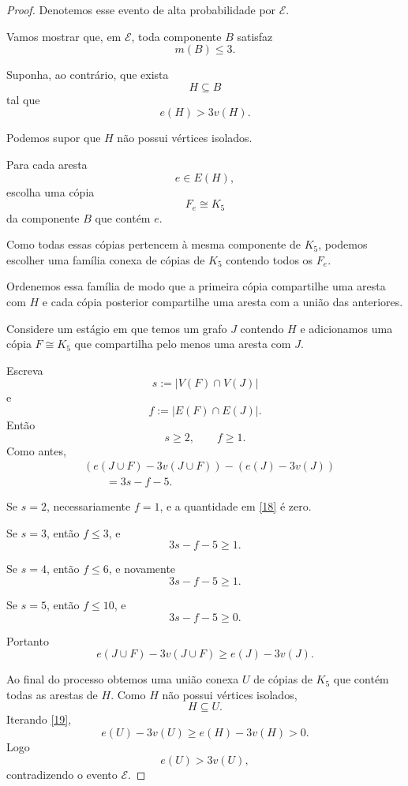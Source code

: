 \documentclass[reqno, 12pt]{amsart}
\numberwithin{equation}{section}
\theoremstyle{plain}
\theoremstyle{definition}
\begin{document}
\begin{proof}
  Denotemos esse evento de alta probabilidade por $\mathcal E$.

  Vamos mostrar que, em $\mathcal E$, toda componente $B$ satisfaz
  \[
    m(B)\le3.
  \]

  Suponha, ao contrário, que exista
  \[
    H\subseteq B
  \]
  tal que
  \[
    e(H)>3v(H).
    \tag{17}\label{17}
  \]

  Podemos supor que $H$ não possui vértices isolados.

  Para cada aresta
  \[
    e\in E(H),
  \]
  escolha uma cópia
  \[
    F_e\cong K_5
  \]
  da componente $B$ que contém $e$.

  Como todas essas cópias pertencem à mesma componente de $K_5$,
  podemos escolher uma família conexa de cópias de $K_5$ contendo todos
  os $F_e$.

  Ordenemos essa família de modo que a primeira cópia compartilhe uma
  aresta com $H$ e cada cópia posterior compartilhe uma aresta com a
  união das anteriores.

  Considere um estágio em que temos um grafo $J$ contendo $H$ e
  adicionamos uma cópia $F\cong K_5$ que compartilha pelo menos uma
  aresta com $J$.

  Escreva
  \[
    s:=|V(F)\cap V(J)|
  \]
  e
  \[
    f:=|E(F)\cap E(J)|.
  \]
  Então
  \[
    s\ge2,\qquad f\ge1.
  \]
  Como antes,
  \[
    \begin{aligned}
       & (e(J\cup F)-3v(J\cup F))
      -(e(J)-3v(J))               \\
       & \qquad
      =3s-f-5.
    \end{aligned}
    \tag{18}\label{18}
  \]

  Se $s=2$, necessariamente $f=1$, e a quantidade em
  \eqref{18} é zero.

  Se $s=3$, então $f\le3$, e
  \[
    3s-f-5\ge1.
  \]

  Se $s=4$, então $f\le6$, e novamente
  \[
    3s-f-5\ge1.
  \]

  Se $s=5$, então $f\le10$, e
  \[
    3s-f-5\ge0.
  \]

  Portanto
  \[
    e(J\cup F)-3v(J\cup F)
    \ge
    e(J)-3v(J).
    \tag{19}\label{19}
  \]

  Ao final do processo obtemos uma união conexa $U$ de cópias de
  $K_5$ que contém todas as arestas de $H$. Como $H$ não possui
  vértices isolados,
  \[
    H\subseteq U.
  \]
  Iterando \eqref{19},
  \[
    e(U)-3v(U)
    \ge
    e(H)-3v(H)
    >0.
  \]
  Logo
  \[
    e(U)>3v(U),
  \]
  contradizendo o evento $\mathcal E$.


\end{proof}
\end{document}
